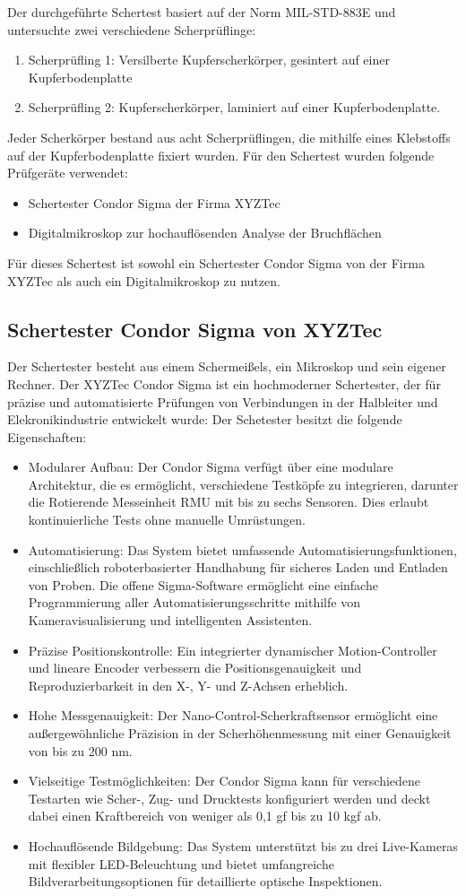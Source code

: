 Der durchgeführte Schertest basiert auf der Norm MIL-STD-883E und untersuchte zwei verschiedene Scherprüflinge:
\begin{enumerate}
    \item Scherprüfling 1: Versilberte Kupferscherkörper, gesintert auf einer Kupferbodenplatte
    \item Scherprüfling 2: Kupferscherkörper, laminiert auf einer Kupferbodenplatte.
\end{enumerate}
Jeder Scherkörper bestand aus acht Scherprüflingen, die mithilfe eines Klebstoffs auf der Kupferbodenplatte fixiert wurden.
Für den Schertest wurden folgende Prüfgeräte verwendet:
\begin{itemize}
    \item Schertester Condor Sigma der Firma XYZTec
    \item Digitalmikroskop zur hochauflösenden Analyse der Bruchflächen
\end{itemize}
Für dieses Schertest ist sowohl ein Schertester Condor Sigma von der Firma XYZTec als auch ein Digitalmikroskop  zu nutzen. 
\subsection{Schertester Condor Sigma von XYZTec}
Der Schertester besteht aus einem Schermeißels, ein Mikroskop und sein eigener Rechner. 
Der XYZTec Condor Sigma ist ein hochmoderner Schertester, der für präzise und automatisierte Prüfungen von Verbindungen in der Halbleiter und Elekronikindustrie entwickelt wurde:
Der Schetester besitzt die folgende Eigenschaften:
\begin{itemize}
    \item Modularer Aufbau: Der Condor Sigma verfügt über eine modulare Architektur, die es ermöglicht, verschiedene Testköpfe zu integrieren, darunter die Rotierende Messeinheit RMU mit bis zu sechs Sensoren. Dies erlaubt kontinuierliche Tests ohne manuelle Umrüstungen. 
    \item Automatisierung: Das System bietet umfassende Automatisierungsfunktionen, einschließlich roboterbasierter Handhabung für sicheres Laden und Entladen von Proben. Die offene Sigma-Software ermöglicht eine einfache Programmierung aller Automatisierungsschritte mithilfe von Kameravisualisierung und intelligenten Assistenten.
    \item Präzise Positionskontrolle: Ein integrierter dynamischer Motion-Controller und lineare Encoder verbessern die Positionsgenauigkeit und Reproduzierbarkeit in den X-, Y- und Z-Achsen erheblich.
    \item Hohe Messgenauigkeit: Der Nano-Control-Scherkraftsensor ermöglicht eine außergewöhnliche Präzision in der Scherhöhenmessung mit einer Genauigkeit von bis zu 200 nm. 
    \item Vielseitige Testmöglichkeiten: Der Condor Sigma kann für verschiedene Testarten wie Scher-, Zug- und Drucktests konfiguriert werden und deckt dabei einen Kraftbereich von weniger als 0,1 gf bis zu 10 kgf ab. 
    \item Hochauflösende Bildgebung: Das System unterstützt bis zu drei Live-Kameras mit flexibler LED-Beleuchtung und bietet umfangreiche Bildverarbeitungsoptionen für detaillierte optische Inspektionen.\cite{2}
\end{itemize}
